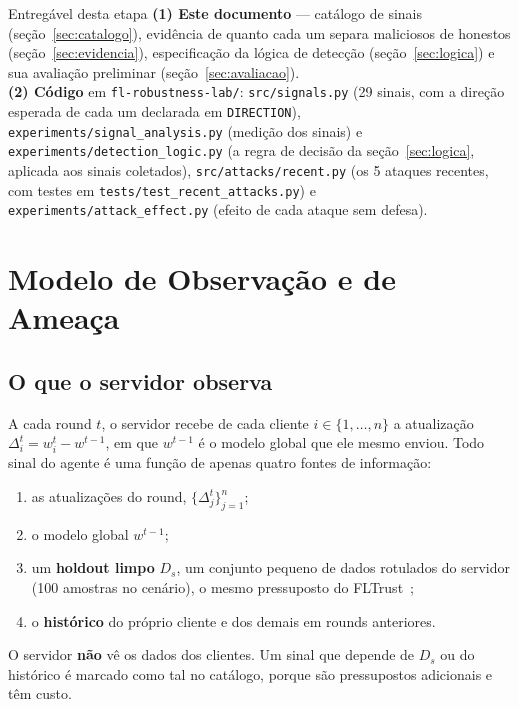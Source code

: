\documentclass[11pt,a4paper]{article}
\begin{document}
\begin{calloutbox}{Entregável desta etapa}
\textbf{(1) Este documento} --- catálogo de sinais (seção~\ref{sec:catalogo}), evidência de quanto cada um
separa maliciosos de honestos (seção~\ref{sec:evidencia}), especificação da lógica de detecção
(seção~\ref{sec:logica}) e sua avaliação preliminar (seção~\ref{sec:avaliacao}).\\[4pt]
\textbf{(2) Código} em \texttt{fl-robustness-lab/}:
\texttt{src/signals.py} (29 sinais, com a direção esperada de cada um declarada em \texttt{DIRECTION}),
\texttt{experiments/signal\_analysis.py} (medição dos sinais) e
\texttt{experiments/detection\_logic.py} (a regra de decisão da seção~\ref{sec:logica}, aplicada aos
sinais coletados), \texttt{src/attacks/recent.py} (os 5 ataques recentes, com testes em
\texttt{tests/test\_recent\_attacks.py}) e \texttt{experiments/attack\_effect.py} (efeito de cada ataque
sem defesa).
\end{calloutbox}

\section{Modelo de Observação e de Ameaça}
\label{sec:modelo}

\subsection{O que o servidor observa}
A cada round $t$, o servidor recebe de cada cliente $i \in \{1,\dots,n\}$ a atualização
$\Delta_i^t = w_i^t - w^{t-1}$, em que $w^{t-1}$ é o modelo global que ele mesmo enviou. Todo sinal do
agente é uma função de apenas quatro fontes de informação:
\begin{enumerate}
  \item as atualizações do round, $\{\Delta_j^t\}_{j=1}^{n}$;
  \item o modelo global $w^{t-1}$;
  \item um \textbf{holdout limpo} $D_s$, um conjunto pequeno de dados rotulados do servidor (100 amostras
        no cenário), o mesmo pressuposto do FLTrust~\cite{fltrust};
  \item o \textbf{histórico} do próprio cliente e dos demais em rounds anteriores.
\end{enumerate}
O servidor \textbf{não} vê os dados dos clientes. Um sinal que depende de $D_s$ ou do histórico é marcado
como tal no catálogo, porque são pressupostos adicionais e têm custo.
\end{document}
